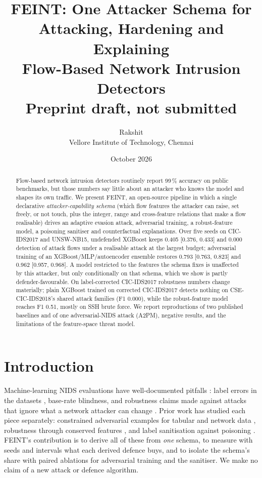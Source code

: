 \documentclass[11pt]{article}
\title{FEINT: One Attacker Schema for Attacking, Hardening and Explaining\\Flow-Based Network Intrusion Detectors\\[4pt]\large Preprint draft, not submitted}
\author{Rakshit\\Vellore Institute of Technology, Chennai}
\date{October 2026}
\begin{document}
\maketitle

\begin{abstract}
Flow-based network intrusion detectors routinely report 99\,\% accuracy on public benchmarks, but
those numbers say little about an attacker who knows the model and shapes its own traffic. We
present FEINT, an open-source pipeline in which a single declarative \emph{attacker-capability
schema} (which flow features the attacker can raise, set freely, or not touch, plus the integer,
range and cross-feature relations that make a flow realisable) drives an adaptive evasion attack,
adversarial training, a robust-feature model, a poisoning sanitiser and counterfactual
explanations. Over five seeds on CIC-IDS2017 and UNSW-NB15, undefended XGBoost keeps
0.405 [0.376, 0.433] and 0.000 detection of attack flows under a realisable attack at the largest
budget; adversarial training of an XGBoost/MLP/autoencoder ensemble restores 0.793 [0.763, 0.823]
and 0.962 [0.957, 0.968]. A model restricted to the features the schema fixes is unaffected by this
attacker, but only conditionally on that schema, which we show is partly defender-favourable. On
label-corrected CIC-IDS2017 robustness numbers change materially; plain XGBoost trained on corrected
CIC-IDS2017 detects nothing on CSE-CIC-IDS2018's shared attack families (F1 0.000), while the
robust-feature model reaches F1 0.51, mostly on SSH brute force. We
report reproductions of two published baselines and of one adversarial-NIDS attack (A2PM), negative
results, and the limitations of the feature-space threat model.
\end{abstract}

\section{Introduction}
Machine-learning NIDS evaluations have well-documented pitfalls \cite{arp2022}: label errors in the
datasets \cite{engelen2021,liu2022}, base-rate blindness, and robustness claims made against
attacks that ignore what a network attacker can change \cite{pierazzi2020}. Prior work has studied
each piece separately: constrained adversarial examples for tabular and network data
\cite{simonetto2022,vitorino2022}, robustness through conserved features \cite{tong2019}, and
label sanitisation against poisoning \cite{paudice2018}. FEINT's contribution is to derive all of
these from \emph{one} schema, to measure with seeds and intervals what each derived defence buys,
and to isolate the schema's share with paired ablations for adversarial training and the
sanitiser. We make no claim of a new attack or defence algorithm.
\end{document}
